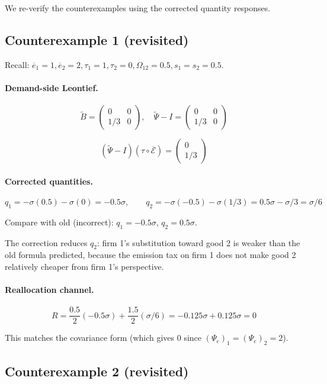 \documentclass[11pt]{article}
\begin{document}
We re-verify the counterexamples using the corrected quantity responses.

\subsection{Counterexample 1 (revisited)}

Recall: $\overline{e}_1 = 1, \overline{e}_2 = 2, \tau_1 = 1, \tau_2 = 0, \Omega_{12} = 0.5, s_1 = s_2 = 0.5$.

\paragraph{Demand-side Leontief.}
$$\widetilde{B} = \begin{pmatrix} 0 & 0 \\ 1/3 & 0 \end{pmatrix}, \quad
\widetilde{\Psi} - I = \begin{pmatrix} 0 & 0 \\ 1/3 & 0 \end{pmatrix}$$

$$(\widetilde{\Psi} - I)(\tau \circ \overline{\mathcal{E}}) = \begin{pmatrix} 0 \\ 1/3 \end{pmatrix}$$

\paragraph{Corrected quantities.}
$$q_1 = -\sigma(0.5) - \sigma(0) = -0.5\sigma, \qquad q_2 = -\sigma(-0.5) - \sigma(1/3) = 0.5\sigma - \sigma/3 = \sigma/6$$

Compare with old (incorrect): $q_1 = -0.5\sigma$, $q_2 = 0.5\sigma$.

The correction reduces $q_2$: firm 1's substitution toward good 2 is weaker than the old formula predicted, because the emission tax on firm 1 does not make good 2 relatively cheaper from firm 1's perspective.

\paragraph{Reallocation channel.}
$$R = \frac{0.5}{2}(-0.5\sigma) + \frac{1.5}{2}(\sigma/6) = -0.125\sigma + 0.125\sigma = 0$$

This matches the covariance form (which gives 0 since $(\Psi_e)_1 = (\Psi_e)_2 = 2$). \checkmark

\subsection{Counterexample 2 (revisited)}
\end{document}
